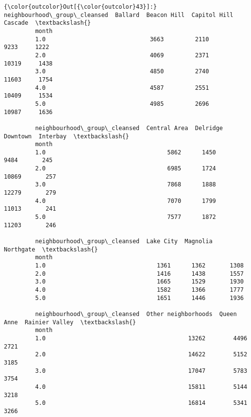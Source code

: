 \documentclass[11pt]{article}
\begin{document}
\begin{Verbatim}[commandchars=\\\{\}]
{\color{outcolor}Out[{\color{outcolor}43}]:} neighbourhood\_group\_cleansed  Ballard  Beacon Hill  Capitol Hill  Cascade  \textbackslash{}
         month                                                                       
         1.0                              3663         2110          9233     1222   
         2.0                              4069         2371         10319     1438   
         3.0                              4850         2740         11603     1754   
         4.0                              4587         2551         10409     1534   
         5.0                              4985         2696         10987     1636   
         
         neighbourhood\_group\_cleansed  Central Area  Delridge  Downtown  Interbay  \textbackslash{}
         month                                                                      
         1.0                                   5862      1450      9484       245   
         2.0                                   6985      1724     10869       257   
         3.0                                   7868      1888     12279       279   
         4.0                                   7070      1799     11013       241   
         5.0                                   7577      1872     11203       246   
         
         neighbourhood\_group\_cleansed  Lake City  Magnolia  Northgate  \textbackslash{}
         month                                                          
         1.0                                1361      1362       1308   
         2.0                                1416      1438       1557   
         3.0                                1665      1529       1930   
         4.0                                1582      1366       1777   
         5.0                                1651      1446       1936   
         
         neighbourhood\_group\_cleansed  Other neighborhoods  Queen Anne  Rainier Valley  \textbackslash{}
         month                                                                           
         1.0                                         13262        4496            2721   
         2.0                                         14622        5152            3185   
         3.0                                         17047        5783            3754   
         4.0                                         15811        5144            3218   
         5.0                                         16814        5341            3266   
         

\end{Verbatim}
\end{document}

